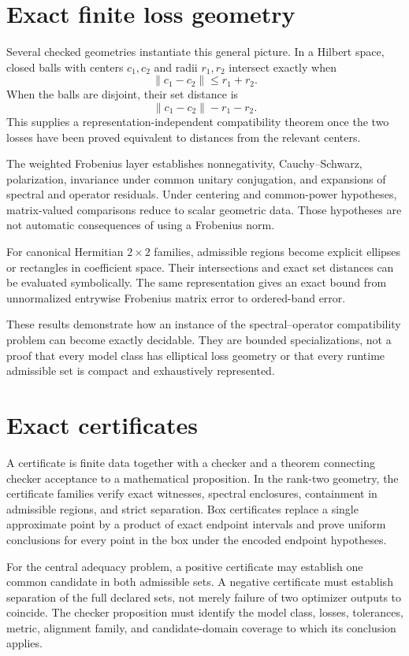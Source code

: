 \section{Exact finite loss geometry}

Several checked geometries instantiate this general picture.  In a Hilbert space,
closed balls with centers $c_1,c_2$ and radii $r_1,r_2$ intersect exactly when
\[
  \lVert c_1-c_2\rVert\leq r_1+r_2.
\]
When the balls are disjoint, their set distance is
\[
  \lVert c_1-c_2\rVert-r_1-r_2.
\]
This supplies a representation-independent compatibility theorem once the two losses
have been proved equivalent to distances from the relevant centers.

The weighted Frobenius layer establishes nonnegativity, Cauchy--Schwarz, polarization,
invariance under common unitary conjugation, and expansions of spectral and operator
residuals.  Under centering and common-power hypotheses, matrix-valued comparisons
reduce to scalar geometric data.  Those hypotheses are not automatic consequences of
using a Frobenius norm.

For canonical Hermitian $2\times2$ families, admissible regions become explicit ellipses
or rectangles in coefficient space.  Their intersections and exact set distances can
be evaluated symbolically.  The same representation gives an exact bound from
unnormalized entrywise Frobenius matrix error to ordered-band error.

These results demonstrate how an instance of the spectral--operator compatibility
problem can become exactly decidable.  They are bounded specializations, not a proof
that every model class has elliptical loss geometry or that every runtime admissible
set is compact and exhaustively represented.

\section{Exact certificates}

A certificate is finite data together with a checker and a theorem connecting checker
acceptance to a mathematical proposition.  In the rank-two geometry, the certificate
families verify exact witnesses, spectral enclosures, containment in admissible regions,
and strict separation.  Box certificates replace a single approximate point by a
product of exact endpoint intervals and prove uniform conclusions for every point in
the box under the encoded endpoint hypotheses.

For the central adequacy problem, a positive certificate may establish one common
candidate in both admissible sets.  A negative certificate must establish separation of
the full declared sets, not merely failure of two optimizer outputs to coincide.  The
checker proposition must identify the model class, losses, tolerances, metric,
alignment family, and candidate-domain coverage to which its conclusion applies.

